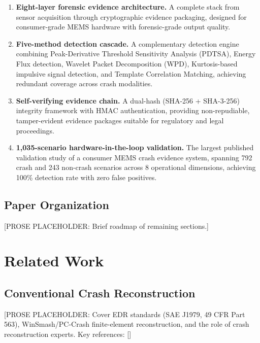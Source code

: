 \documentclass[conference,twocolumn]{IEEEtran}
\begin{document}
\begin{enumerate}
  \item \textbf{Eight-layer forensic evidence architecture.} A complete stack from sensor acquisition through cryptographic evidence packaging, designed for consumer-grade MEMS hardware with forensic-grade output quality.

  \item \textbf{Five-method detection cascade.} A complementary detection engine combining Peak-Derivative Threshold Sensitivity Analysis (PDTSA), Energy Flux detection, Wavelet Packet Decomposition (WPD), Kurtosis-based impulsive signal detection, and Template Correlation Matching, achieving redundant coverage across crash modalities.

  \item \textbf{Self-verifying evidence chain.} A dual-hash (SHA-256 + SHA-3-256) integrity framework with HMAC authentication, providing non-repudiable, tamper-evident evidence packages suitable for regulatory and legal proceedings.

  \item \textbf{1,035-scenario hardware-in-the-loop validation.} The largest published validation study of a consumer MEMS crash evidence system, spanning 792 crash and 243 non-crash scenarios across 8 operational dimensions, achieving 100\% detection rate with zero false positives.
\end{enumerate}

\subsection{Paper Organization}

[PROSE PLACEHOLDER: Brief roadmap of remaining sections.]

\section{Related Work}

\subsection{Conventional Crash Reconstruction}

[PROSE PLACEHOLDER: Cover EDR standards (SAE J1979, 49 CFR Part 563), WinSmash/PC-Crash finite-element reconstruction, and the role of crash reconstruction experts. Key references: []
\end{document}
